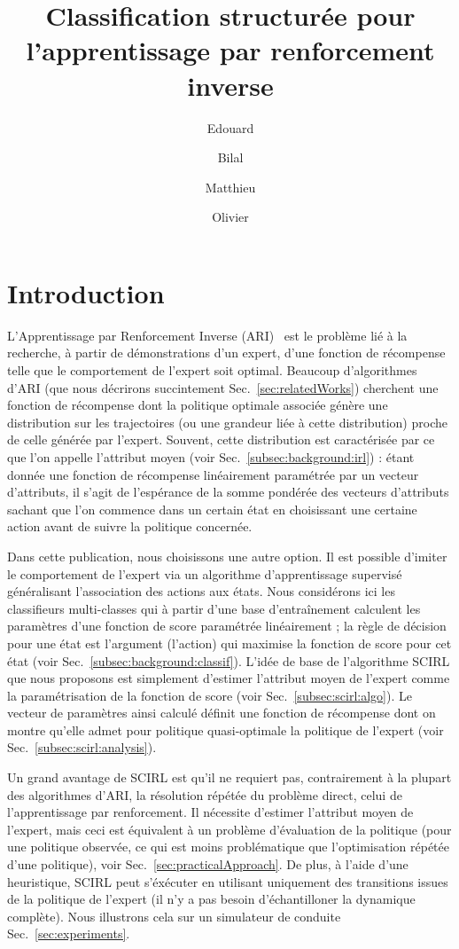 \documentclass[english,utf8]{./hermes-journal}
\title[SCIRL]{Classification structurée pour l'apprentissage par renforcement inverse}
\author[1,2]{Edouard}{Klein}
\author[2,3]{Bilal}{Piot}
\author[2]{Matthieu}{Geist}
\author[2,3]{Olivier}{Pietquin}
\begin{document}
\maketitle

\newpage
\section{Introduction}
\label{sec:intro}

L'Apprentissage par Renforcement Inverse (ARI)~\cite{Russell:1998} est le problème lié à la recherche, à partir de démonstrations d'un expert, d'une fonction de récompense telle que le comportement de l'expert soit optimal. Beaucoup d'algorithmes d'ARI (que nous décrirons succintement Sec.~\ref{sec:relatedWorks}) cherchent une fonction de récompense dont la politique optimale associée génère une distribution sur les trajectoires (ou une grandeur liée à cette distribution) proche de celle générée par l'expert. Souvent, cette distribution est caractérisée par ce que l'on appelle l'attribut moyen (voir Sec.~\ref{subsec:background:irl}) : étant donnée une fonction de récompense linéairement paramétrée par un vecteur d'attributs, il s'agit de l'espérance de la somme pondérée des vecteurs d'attributs sachant que l'on commence dans un certain état en choisissant une certaine action avant de suivre la politique concernée.

Dans cette publication, nous choisissons une autre option. Il est possible d'imiter le comportement de l'expert via un algorithme d'apprentissage supervisé généralisant l'association des actions aux états. Nous considérons ici les classifieurs multi-classes qui à partir d'une base d'entraînement calculent les paramètres d'une fonction de score paramétrée linéairement ; la règle de décision pour une état est l'argument (l'action) qui maximise la fonction de score pour cet état (voir Sec.~\ref{subsec:background:classif}). L'idée de base de l'algorithme SCIRL que nous proposons est simplement d'estimer l'attribut moyen de l'expert comme la paramétrisation de la fonction de score (voir Sec.~\ref{subsec:scirl:algo}). Le vecteur de paramètres ainsi calculé définit une fonction de récompense dont on montre qu'elle admet pour politique quasi-optimale la politique de l'expert (voir Sec.~\ref{subsec:scirl:analysis}).

Un grand avantage de SCIRL est qu'il ne requiert pas, contrairement à la plupart des algorithmes d'ARI, la résolution répétée du problème direct, celui de l'apprentissage par renforcement. Il nécessite d'estimer l'attribut moyen de l'expert, mais ceci est équivalent à un problème d'évaluation de la politique (pour une politique observée, ce qui est moins problématique que l'optimisation répétée d'une politique), voir Sec.~\ref{sec:practicalApproach}.
De plus, à l'aide d'une heuristique, SCIRL peut s'éxécuter en utilisant uniquement des transitions issues de la politique de l'expert (il n'y a pas besoin d'échantilloner la dynamique complète). Nous illustrons cela sur un simulateur de conduite Sec.~\ref{sec:experiments}.
\end{document}

